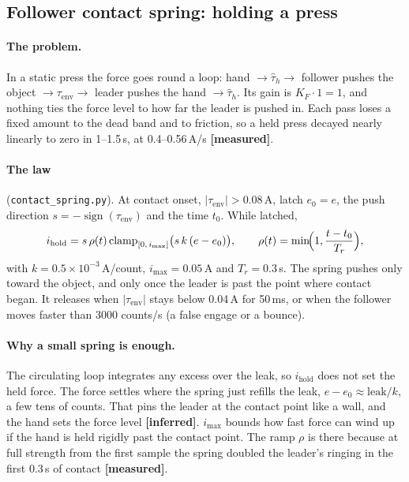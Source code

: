 \documentclass[11pt,a4paper]{article}
\newcommand{\A}{\,\mathrm{A}}
\newcommand{\file}[1]{\texttt{#1}}
\newcommand{\measured}{\textcolor{teal!70!black}{\textbf{[measured]}}}
\newcommand{\inferred}{\textcolor{orange!80!black}{\textbf{[inferred]}}}
\begin{document}
\subsection{Follower contact spring: holding a press}
\label{sec:holdspring}

\paragraph{The problem.} In a static press the force goes round a loop:
hand $\to\hat\tau_h\to$ follower pushes the object $\to\tau_{\mathrm{env}}\to$
leader pushes the hand $\to\hat\tau_h$. Its gain is $K_F\cdot 1 = 1$, and
nothing ties the force level to how far the leader is pushed in. Each pass
loses a fixed amount to the dead band and to friction, so a held press
decayed nearly linearly to zero in 1--1.5\,s, at 0.4--0.56\,A/s
\measured.

\paragraph{The law} (\file{contact\_spring.py}). At contact onset,
$|\tau_{\mathrm{env}}| > 0.08\A$, latch $e_0 = e$, the push direction
$s = -\operatorname{sign}(\tau_{\mathrm{env}})$ and the time $t_0$. While
latched,
\begin{equation}
  i_{\mathrm{hold}} = s\,\rho(t)\,\mathrm{clamp}_{[0,\,i_{\max}]}\bigl(s\,k\,(e - e_0)\bigr),
  \qquad \rho(t) = \min\!\Bigl(1, \frac{t - t_0}{T_r}\Bigr),
\end{equation}
with $k = 0.5\times10^{-3}$\,A/count, $i_{\max} = 0.05\A$ and
$T_r = 0.3$\,s. The spring pushes only toward the object, and only once
the leader is past the point where contact began. It releases when
$|\tau_{\mathrm{env}}|$ stays below 0.04\,A for 50\,ms, or when the
follower moves faster than 3000 counts/s (a false engage or a bounce).

\paragraph{Why a small spring is enough.} The circulating loop integrates
any excess over the leak, so $i_{\mathrm{hold}}$ does not set the held
force. The force settles where the spring just refills the leak,
$e - e_0 \approx \text{leak}/k$, a few tens of counts. That pins the leader
at the contact point like a wall, and the hand sets the force level
\inferred. $i_{\max}$ bounds how fast force can wind up if the hand is held
rigidly past the contact point. The ramp $\rho$ is there because at full
strength from the first sample the spring doubled the leader's ringing in
the first 0.3\,s of contact \measured.
\end{document}
